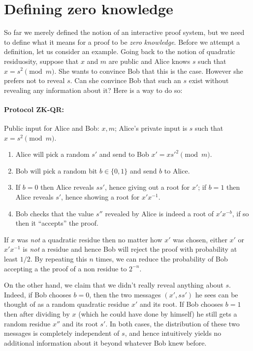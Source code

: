 \section{Defining zero knowledge}\label{13-Defining-zero-knowledg}

So far we merely defined the notion of an interactive proof system, but
we need to define what it means for a proof to be \emph{zero knowledge}.
Before we attempt a definition, let us consider an example. Going back
to the notion of quadratic residuosity, suppose that \(x\) and \(m\) are
public and Alice knows \(s\) such that \(x=s^2 \pmod{m}\). She wants to
convince Bob that this is the case. However she prefers not to reveal
\(s\). Can she convince Bob that such an \(s\) exist without revealing
any information about it? Here is a way to do so:

\paragraph{Protocol ZK-QR:} Public input for Alice and Bob: \(x,m\);
Alice's private input is \(s\) such that \(x=s^2 \pmod{m}\).

\begin{enumerate}
\def\labelenumi{\arabic{enumi}.}
\item
  Alice will pick a random \(s'\) and send to Bob
  \(x' = xs'^2 \pmod{m}\).
\item
  Bob will pick a random bit \(b\in\{0,1\}\) and send \(b\) to Alice.
\item
  If \(b=0\) then Alice reveals \(ss'\), hence giving out a root for
  \(x'\); if \(b=1\) then Alice reveals \(s'\), hence showing a root for
  \(x'x^{-1}\).
\item
  Bob checks that the value \(s''\) revealed by Alice is indeed a root
  of \(x'x^{-b}\), if so then it ``accepts'' the proof.
\end{enumerate}

If \(x\) was \emph{not} a quadratic residue then no matter how \(x'\)
was chosen, either \(x'\) or \(x'x^{-1}\) is \emph{not} a residue and
hence Bob will reject the proof with probability at least \(1/2\). By
repeating this \(n\) times, we can reduce the probability of Bob
accepting a the proof of a non residue to \(2^{-n}\).

On the other hand, we claim that we didn't really reveal anything about
\(s\). Indeed, if Bob chooses \(b=0\), then the two messages
\((x',ss')\) he sees can be thought of as a random quadratic residue
\(x'\) and its root. If Bob chooses \(b=1\) then after dividing by \(x\)
(which he could have done by himself) he still gets a random residue
\(x''\) and its root \(s'\). In both cases, the distribution of these
two messages is completely independent of \(s\), and hence intuitively
yields no additional information about it beyond whatever Bob knew
before.

